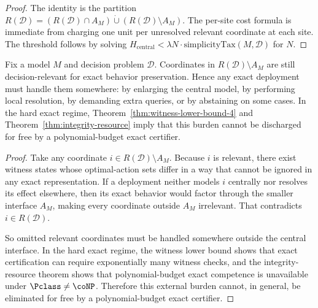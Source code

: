 \begin{proof}
The identity is the partition
$R(\mathcal{D}) = (R(\mathcal{D}) \cap A_M) \dot\cup (R(\mathcal{D}) \setminus A_M)$. The per-site cost formula is immediate from charging one unit per unresolved relevant coordinate at each site. The threshold follows by solving
$H_{\mathrm{central}} < \lambda N\cdot \mathrm{simplicityTax}(M,\mathcal{D})$
for $N$.
\end{proof}

\begin{corollary}
Fix a model $M$ and decision problem $\mathcal{D}$. Coordinates in $R(\mathcal{D})\setminus A_M$ are still decision-relevant for exact behavior preservation. Hence any exact deployment must handle them somewhere: by enlarging the central model, by performing local resolution, by demanding extra queries, or by abstaining on some cases. In the hard exact regime, Theorem~\ref{thm:witness-lower-bound-4} and Theorem~\ref{thm:integrity-resource} imply that this burden cannot be discharged for free by a polynomial-budget exact certifier.
\end{corollary}


\begin{proof}
Take any coordinate $i\in R(\mathcal{D})\setminus A_M$. Because $i$ is relevant, there exist witness states whose optimal-action sets differ in a way that cannot be ignored in any exact representation. If a deployment neither models $i$ centrally nor resolves its effect elsewhere, then its exact behavior would factor through the smaller interface $A_M$, making every coordinate outside $A_M$ irrelevant. That contradicts $i\in R(\mathcal{D})$.

So omitted relevant coordinates must be handled somewhere outside the central interface. In the hard exact regime, the witness lower bound shows that exact certification can require exponentially many witness checks, and the integrity-resource theorem shows that polynomial-budget exact competence is unavailable under $\Pclass\neq\coNP$. Therefore this external burden cannot, in general, be eliminated for free by a polynomial-budget exact certifier.
\end{proof}
